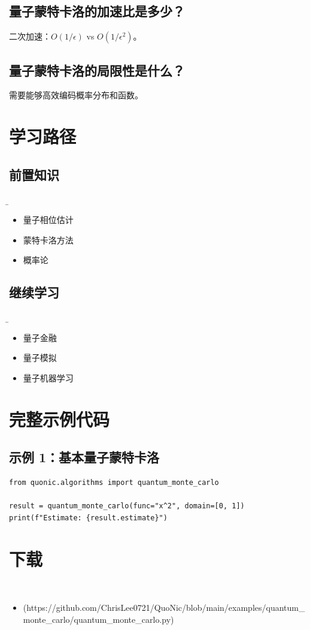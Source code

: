 \documentclass[12pt,a4paper]{article}
\begin{document}
\subsection{量子蒙特卡洛的加速比是多少？}

二次加速：$O(1/\epsilon)$ vs $O(1/\epsilon^2)$。

\subsection{量子蒙特卡洛的局限性是什么？}

需要能够高效编码概率分布和函数。

\section{学习路径}

\subsection{前置知识}
\b\begin{itemize}
  \item 量子相位估计
  \item 蒙特卡洛方法
  \item 概率论
\end{itemize}

\subsection{继续学习}
\b\begin{itemize}
  \item 量子金融
  \item 量子模拟
  \item 量子机器学习
\end{itemize}

\section{完整示例代码}

\subsection{示例 1：基本量子蒙特卡洛}

\begin{lstlisting}[style=python]
from quonic.algorithms import quantum_monte_carlo

result = quantum_monte_carlo(func="x^2", domain=[0, 1])
print(f"Estimate: {result.estimate}")
\end{lstlisting}


\section{下载}

\begin{itemize}
  \item [quantum_monte_carlo.py](https://github.com/ChrisLee0721/QuoNic/blob/main/examples/quantum_monte_carlo/quantum_monte_carlo.py)
\end{itemize}
\end{document}
